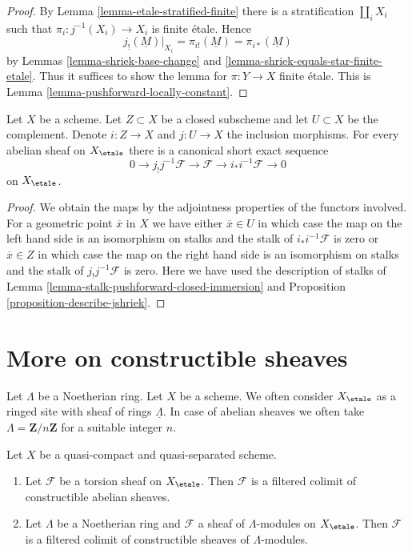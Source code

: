 \begin{proof}
By Lemma \ref{lemma-etale-stratified-finite} there is a stratification
$\coprod_i X_i$ such that $\pi_i: j^{-1}(X_i) \to X_i$ is finite \'etale.
Hence
$$
j_!(\underline{M})|_{X_i} =
\pi_{i!}(\underline{M}) =
\pi_{i*}(\underline{M})
$$
by Lemmas \ref{lemma-shriek-base-change} and
\ref{lemma-shriek-equals-star-finite-etale}.
Thus it suffices to show the lemma for $\pi : Y \to X$ finite \'etale.
This is Lemma \ref{lemma-pushforward-locally-constant}.
\end{proof}

\begin{lemma}
\label{lemma-ses-associated-to-open}
Let $X$ be a scheme. Let $Z \subset X$ be a closed subscheme and let
$U \subset X$ be the complement. Denote $i : Z \to X$ and $j : U \to X$
the inclusion morphisms. For every abelian sheaf on $X_\etale$
there is a canonical short exact sequence
$$
0 \to j_!j^{-1}\mathcal{F} \to \mathcal{F} \to i_*i^{-1}\mathcal{F} \to 0
$$
on $X_\etale$.
\end{lemma}

\begin{proof}
We obtain the maps by the adjointness properties of the functors
involved. For a geometric point $\overline{x}$ in $X$ we have either
$\overline{x} \in U$ in which case the map on the left hand side
is an isomorphism on stalks and the stalk of $i_*i^{-1}\mathcal{F}$
is zero or $\overline{x} \in Z$ in which case the map on the right hand side
is an isomorphism on stalks and the stalk of $j_!j^{-1}\mathcal{F}$
is zero. Here we have used the description of stalks of
Lemma \ref{lemma-stalk-pushforward-closed-immersion} and
Proposition \ref{proposition-describe-jshriek}.
\end{proof}








\section{More on constructible sheaves}
\label{section-more-constructible}

\noindent
Let $\Lambda$ be a Noetherian ring. Let $X$ be a scheme.
We often consider $X_\etale$ as a ringed site with
sheaf of rings $\underline{\Lambda}$. In case of abelian sheaves
we often take $\Lambda = \mathbf{Z}/n\mathbf{Z}$ for a suitable
integer $n$.

\begin{lemma}
\label{lemma-torsion-colimit-constructible}
Let $X$ be a quasi-compact and quasi-separated scheme.
\begin{enumerate}
\item Let $\mathcal{F}$ be a torsion sheaf on $X_\etale$.
Then $\mathcal{F}$ is a filtered colimit of constructible abelian sheaves.
\item Let $\Lambda$ be a Noetherian ring and $\mathcal{F}$ a sheaf
of $\Lambda$-modules on $X_\etale$. Then
$\mathcal{F}$ is a filtered colimit of constructible sheaves of
$\Lambda$-modules.
\end{enumerate}
\end{lemma}

